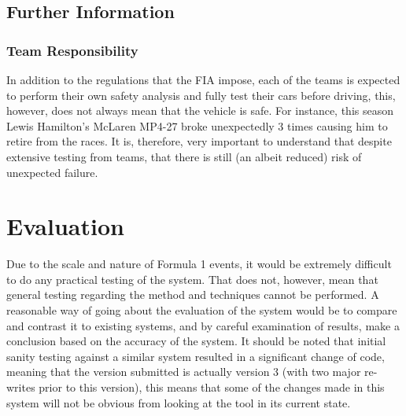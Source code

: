 \documentclass[12pt]{article} %
\begin{document}


\subsection{Further Information} %
\subsubsection{Team Responsibility}
In addition to the regulations that the FIA impose, each of the teams is expected to perform their own safety analysis and fully test their cars before driving, this, however, does not always mean that the vehicle is safe. For instance, this season Lewis Hamilton's McLaren MP4-27 broke unexpectedly 3 times causing him to retire from the races. It is, therefore, very important to understand that despite extensive testing from teams, that there is still (an albeit reduced) risk of unexpected failure.

\section{Evaluation}

Due to the scale and nature of Formula 1 events, it would be extremely difficult to do any practical testing of the system. That does not, however, mean that general testing regarding the method and techniques cannot be performed. A reasonable way of going about the evaluation of the system would be to compare and contrast it to existing systems, and by careful examination of results, make a conclusion based on the accuracy of the system. It should be noted that initial sanity testing against a similar system resulted in a significant change of code, meaning that the version submitted is actually version 3 (with two major re-writes prior to this version), this means that some of the changes made in this system will not be obvious from looking at the tool in its current state.
\end{document}
